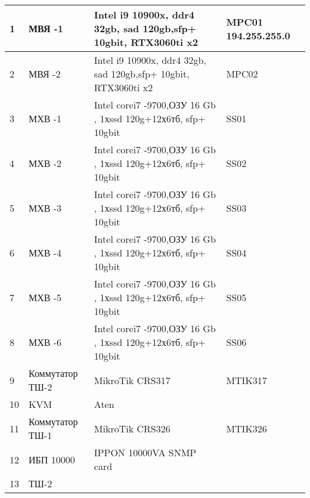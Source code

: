 \begin{landscape}
\begin{center}
\begin{longtable}{|l|l|l|l|}
1 & МВЯ -1 & Intel  i9 10900x, ddr4 32gb, sad 120gb,sfp+ 10gbit, RTX3060ti x2  & MPC01  194.255.255.0 \\\hline
2 & МВЯ -2 & Intel  i9 10900x, ddr4 32gb, sad 120gb,sfp+ 10gbit, RTX3060ti x2    & MPC02 \\\hline
3 & МХВ -1 &Intel   corei7 -9700,ОЗУ 16 Gb , 1хssd 120g+12х6тб, sfp+ 10gbit   & SS01\\\hline
4 & МХВ -2 & Intel   corei7 -9700,ОЗУ 16 Gb , 1хssd 120g+12х6тб, sfp+ 10gbit  & SS02\\\hline
5 & МХВ -3 & Intel   corei7 -9700,ОЗУ 16 Gb , 1хssd 120g+12х6тб, sfp+ 10gbit   & SS03\\\hline
6 & МХВ -4 & Intel   corei7 -9700,ОЗУ 16 Gb , 1хssd 120g+12х6тб, sfp+ 10gbit   & SS04\\\hline
7 & МХВ -5 &Intel   corei7 -9700,ОЗУ 16 Gb , 1хssd 120g+12х6тб, sfp+ 10gbit    & SS05\\\hline
8 & МХВ -6 & Intel   corei7 -9700,ОЗУ 16 Gb , 1хssd 120g+12х6тб, sfp+ 10gbit   & SS06\\\hline
9 & Коммутатор ТШ-2 & MikroTik CRS317  & MTIK317 \\\hline
10 & KVM & Aten & \\\hline
11  & Коммутатор ТШ-1  &MikroTik CRS326   & MTIK326\\\hline
12 & ИБП 10000   & IPPON 10000VA
SNMP card  & \\\hline
13  & ТШ-2   &   & \\\hline
 
\end{longtable}
\end{center}
\end{landscape} 